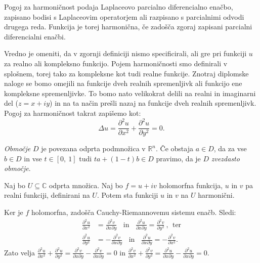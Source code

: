 \documentclass[mat1]{fmfdelo}
\begin{document}
    Pogoj za harmoničnost podaja Laplaceovo parcialno diferencialno enačbo, zapisano bodisi s Laplaceovim operatorjem ali razpisano s parcialnimi odvodi drugega reda. 
    Funkcija je torej harmonična, če zadošča zgoraj zapisani parcialni diferencialni enačbi. 

    \begin{opomba}
        Vredno je omeniti, da v zgornji definiciji nismo specificirali, ali gre pri funkciji $u$ za realno ali kompleksno funkcijo. 
        Pojem harmoničnosti smo definirali v splošnem, torej tako za kompleksne kot tudi realne funkcije.
        Znotraj diplomske naloge se bomo omejili na funkcije dveh realnih spremenljivk ali funkcijo ene kompleksne spremenljivke. To bomo nato velikokrat delili na realni in imaginarni del ($z = x + iy $) in na ta način prešli nazaj na funkcije dveh realnih spremenljivk.
        \newline
        Pogoj za harmoničnost takrat zapišemo kot: 
            $$
                \Delta u = \frac{\partial^2 u}{\partial x ^ 2} +  \frac{\partial^2 u}{\partial y ^ 2}= 0.
            $$
    \end{opomba}

    \begin{definicija}
        \emph{Območje} $D$ je povezana odprta podmnožica v $\mathbb{R}^n$.
        Če obstaja $a \in D$, da za vse $b \in D$ in vse $t \in [0,~1]$ tudi $t a + (1-t)b \in D$ pravimo, da je $D$ \emph{zvezdasto območje}.
    \end{definicija}


    \begin{trditev}
        \label{hh}
        Naj bo $U \subseteq \mathbb{C}$ odprta množica. Naj bo $f = u + iv$ holomorfna funkcija, $u$ in $v$ pa realni funkciji, definirani na $U$. Potem sta funkciji $u$ in $v$ na $U$ harmonični.
    \end{trditev}

    \begin{dokaz}
        Ker je $f$ holomorfna, zadošča Cauchy-Riemannovemu sistemu enačb. Sledi: 
        \begin{align*}
            \frac{\partial^2 u}{\partial x^2} &= \frac{\partial^2 v}{\partial x \partial y}~~~~\text{in}~~~~\frac{\partial^2 u}{\partial x \partial y} = \frac{\partial^2 v}{\partial y^2}~,~~\text{ter}\\ 
            \frac{\partial^2 u}{\partial y^2} &=  - \frac{\partial^2 v}{\partial x \partial y}~~~~\text{in}~~~~\frac{\partial^2 u}{\partial x \partial y} =  - \frac{\partial^2 v}{\partial x^2}.
        \end{align*}
        Zato velja $\frac{\partial^2 u}{\partial x^2} + \frac{\partial^2 u}{\partial y^2} = \frac{\partial^2 v}{\partial x \partial y} - \frac{\partial^2 v}{\partial x \partial y} =0$ in $\frac{\partial^2 v}{\partial x^2} + \frac{\partial^2 v}{\partial y^2} = \frac{\partial^2 u}{\partial x \partial y} - \frac{\partial^2 u}{\partial x \partial y}=0$.
    \end{dokaz}
\end{document}
